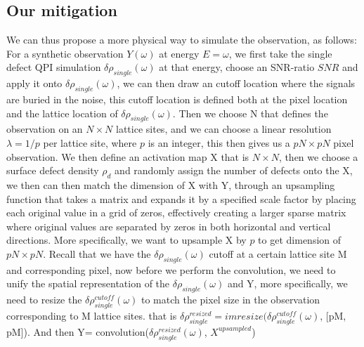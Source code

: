 \subsection{Our mitigation}

We can thus propose a more physical way to simulate the observation, as follows: 
For a synthetic observation $Y(\omega)$ at energy $E=\omega$, we first take the single defect QPI simulation $\delta\rho_{single} (\omega)$ at that energy, choose an SNR-ratio $SNR$ and apply it onto $\delta\rho_{single} (\omega)$, we can then draw an cutoff location where the signals are buried in the noise, this cutoff location is defined both at the pixel location and the lattice location of $\delta\rho_{single} (\omega)$. Then we choose N that defines the observation on an $N\times N$ lattice sites, and we can choose a linear resolution $\lambda = 1/p$ per lattice site, where $p$ is an integer, this then gives us a $pN \times pN$ pixel observation.
We then define an activation map X that is $N\times N$, then we choose a surface defect density $\rho_d$ and randomly assign the number of defects onto the X, we then can then match the dimension of X with Y, through an upsampling function that takes a matrix and expands it by a specified scale factor by placing each original value in a grid of zeros, effectively creating a larger sparse matrix where original values are separated by zeros in both horizontal and vertical directions. More specifically, we want to upsample X by $p$ to get dimension of $pN \times pN$. 
Recall that we have the $\delta\rho_{single} (\omega)$ cutoff at a certain lattice site M and corresponding pixel, now before we perform the convolution, we need to unify the spatial representation of the $\delta\rho_{single} (\omega)$ and Y, more specifically, we need to resize the $\delta\rho^{cutoff}_{single} (\omega)$ to match the pixel size in the observation corresponding to M lattice sites. that is $\delta\rho^{resized}_{single}= imresize(\delta\rho^{cutoff}_{single} (\omega)$, [pM, pM]). And then Y= convolution($\delta\rho^{resized}_{single} (\omega)$, $X^{upsampled}$)

